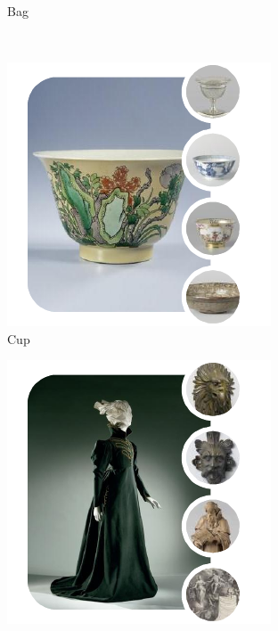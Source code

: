 \documentclass[runningheads]{llncs}
\begin{document}
\begin{figure}
\begin{subfigure}[b]{0.3\textwidth}
		\caption{Bag}
		\label{fig:bag}
	\end{subfigure}
	~ %
	\begin{subfigure}[b]{0.3\textwidth}
		\includegraphics[width=\textwidth]{figures/data_supervisor/cup}
		\caption{Cup}
		\label{fig:cup}
	\end{subfigure}
	\begin{subfigure}[b]{0.3\textwidth}
		\includegraphics[width=\textwidth]{figures/data_supervisor/hair}

\end{subfigure}
\end{figure}
\end{document}
